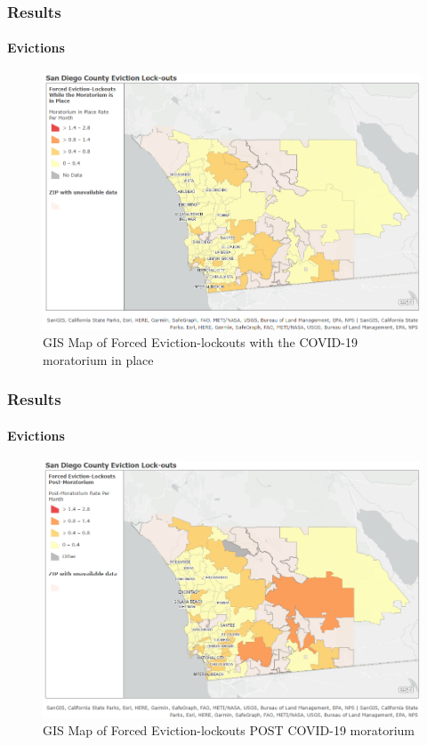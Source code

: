 \documentclass{beamer} %
\begin{document}
\begin{frame}
\frametitle{Results}
\framesubtitle{Evictions}
\begin{figure}[H]
  \includegraphics[width=0.85\linewidth]{figures/gis_during_figure2.png}
  \caption{GIS Map of Forced Eviction-lockouts with the COVID-19 moratorium in place}
  \label{fig:during_moratorium}
\end{figure}
\end{frame}

\begin{frame}
\frametitle{Results}
\framesubtitle{Evictions}
\begin{figure}[H]
  \includegraphics[width=0.85\linewidth]{figures/gis_post_figure3.png}
  \caption{GIS Map of Forced Eviction-lockouts POST COVID-19 moratorium}
  \label{fig:post_moratorium}
\end{figure}
\end{frame}
\end{document}
